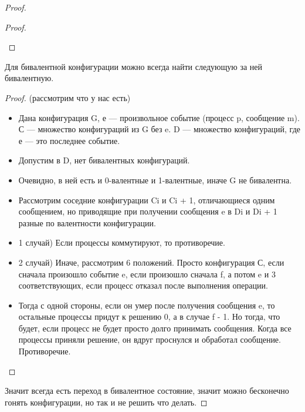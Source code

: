 \begin{proof}
\begin{proof}
\begin{itemize}
        \end{itemize}
    \end{proof}
    \begin{lemma}
    Для бивалентной конфигурации можно всегда найти следующую за ней бивалентную.
    \end{lemma}
    \begin{proof} (рассмотрим что у нас есть)
        \begin{itemize}
            \item Дана конфигурация G, е --- произвольное событие (процесс p, сообщение m). С --- множество конфигураций из G без e. D --- множество конфигураций, где е --- это последнее событие.
            \item Допустим в D, нет бивалентных конфигураций.
            \item Очевидно, в ней есть и 0-валентные и 1-валентные, иначе G не бивалентна.
            \item Рассмотрим соседние конфигурации Ci и Ci + 1, отличающиеся одним сообщением, но приводящие при получении сообщения e в Di и Di + 1 разные по валентности конфигурации.
            \item 1 случай) Если процессы коммутируют, то противоречие.
            \item 2 случай) Иначе, рассмотрим 6 положений. Просто конфигурация С, если сначала произошло событие e, если произошло сначала f, а потом e и 3 соответствующих, если процесс отказал после выполнения операции.
            \item Тогда с одной стороны, если он умер после получения сообщения e, то остальные процессы придут к решению 0, а в случае f -  1. Но тогда, что будет, если процесс не будет просто долго принимать сообщения. Когда все процессы приняли решение, он вдруг проснулся и обработал сообщение. Противоречие.
        \end{itemize}
    \end{proof}
    Значит всегда есть переход в бивалентное состояние, значит можно бесконечно гонять конфигурации, но так и не решить что делать.
\end{proof}